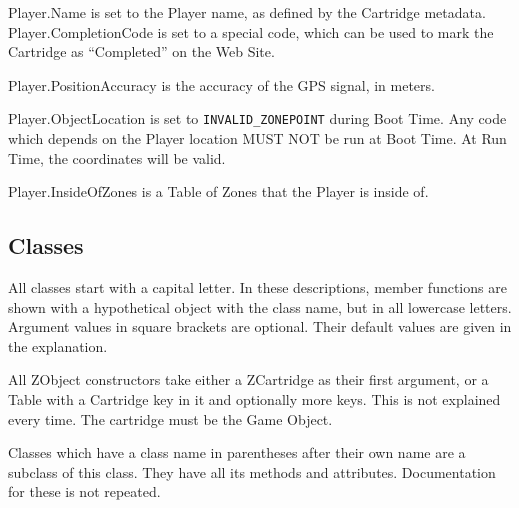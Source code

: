 \documentclass{article}
\begin{document}
Player.Name is set to the Player name, as defined by the Cartridge metadata.
Player.CompletionCode is set to a special code, which can be used to mark the
Cartridge as ``Completed'' on the Web Site.

Player.PositionAccuracy is the accuracy of the GPS signal, in meters.

Player.ObjectLocation is set to \verb-INVALID_ZONEPOINT- during Boot Time.
Any code which depends on the Player location MUST NOT be run at Boot Time.
At Run Time, the coordinates will be valid.

Player.InsideOfZones is a Table of Zones that the Player is inside of.

\subsection{Classes}
All classes start with a capital letter. In these descriptions, member
functions are shown with a hypothetical object with the class name, but in all
lowercase letters. Argument values in square brackets are optional. Their
default values are given in the explanation.

All ZObject constructors take either a ZCartridge as their first argument, or a
Table with a Cartridge key in it and optionally more keys. This is not
explained every time. The cartridge must be the Game Object.

Classes which have a class name in parentheses after their own name are a
subclass of this class. They have all its methods and attributes. Documentation
for these is not repeated.
\end{document}
